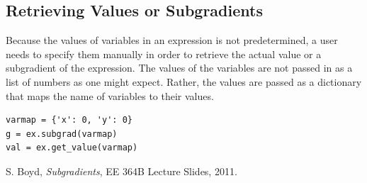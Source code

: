\documentclass[12pt]{article}
\begin{document}
\subsection{Retrieving Values or Subgradients}
Because the values of variables in an expression is not predetermined, a user needs to specify them manually in order to retrieve the actual value or a subgradient of the expression. The values of the variables are not passed in as a list of numbers as one might expect. Rather, the values are passed as a dictionary that maps the name of variables to their values.
\begin{verbatim}
varmap = {'x': 0, 'y': 0}
g = ex.subgrad(varmap)
val = ex.get_value(varmap)
\end{verbatim}

\begin{thebibliography}{99}
 S. Boyd, \emph{Subgradients}, EE 364B Lecture Slides, 2011.
\end{thebibliography}
\end{document}
